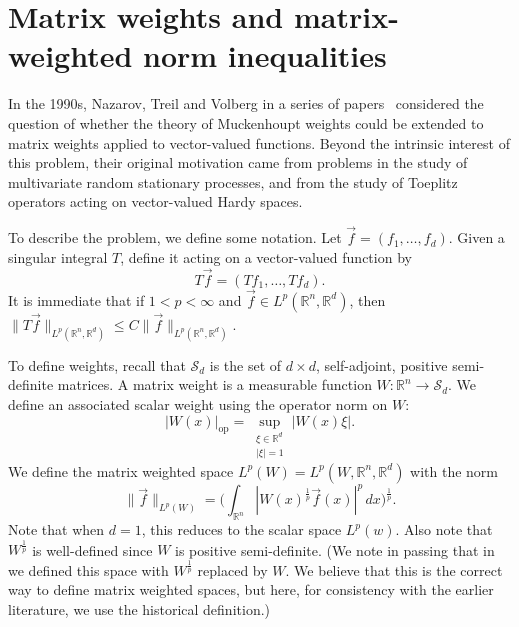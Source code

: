 \documentclass[12pt]{amsart}
\theoremstyle{definition}
\theoremstyle{remark}
\numberwithin{equation}{section}
\newcommand{\rn}{{{\mathbb R}^n}}
\newcommand{\rd}{{{\mathbb R}^d}}
\DeclareMathOperator{\op}{op}
\newcommand{\vecf}{\vec{f}}
\newcommand{\Sd}{\mathcal{S}_d}
\begin{document}
\section{Matrix weights and matrix-weighted norm inequalities}
\label{section:matrix}

In the 1990s, Nazarov, Treil and Volberg in a series of
papers~\cite{MR1428988,MR1428818,MR1478786,MR1423034} considered the
question of whether the theory of Muckenhoupt weights could be
extended to matrix weights applied to vector-valued functions.  Beyond
the intrinsic interest of this problem, their original motivation came
from problems in the study of multivariate random stationary
processes, and from the study of Toeplitz operators acting on
vector-valued Hardy spaces.

To describe the problem, we define some notation.  Let
$\vecf=(f_1,\ldots,f_d)$.  Given a singular integral $T$, define  it
acting on a vector-valued function by
%
\[ T\vecf = (Tf_1,\ldots,Tf_d).  \]
%
It is immediate that if $1<p<\infty$ and $\vecf \in L^p(\rn,\rd )$,
then $\|T\vecf\|_{ L^p(\rn,\rd )} \leq C \|\vecf\|_{ L^p(\rn,\rd )}$.

To define weights, recall that $\Sd$ is the set of $d\times d$,
self-adjoint, positive semi-definite matrices.  A matrix weight is a
measurable function  $W : \rn \rightarrow \Sd$.  We define an
associated scalar weight using the operator norm on $W$:
%
\[ |W(x)|_{\op}
  =
  \sup_{\substack{\xi \in \rd \\|\xi|=1}} |W(x)\xi|. \]
%
We define the matrix weighted space $L^p(W)=L^p(W,\rn,\rd )$ with the norm
%
\[ \|\vecf\|_{L^p(W)} = \bigg( \int_\rn
  |W(x)^{\frac1p}\vecf(x)|^p\,dx\bigg)^{\frac1p}. \]
%
Note that when $d=1$, this reduces to the scalar space $L^p(w)$.  Also
note that $W^{\frac1p}$ is well-defined since $W$ is positive
semi-definite. (We note in passing that in~\cite{mb-2022} we defined
this space with $W^{\frac1p}$ replaced by $W$.   We believe that this is the
correct way to define matrix weighted spaces, but here, for consistency with
the earlier literature, we use the historical definition.)
\end{document}
